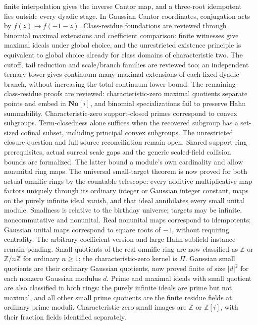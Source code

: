 \documentclass[11pt]{article}
\newcommand{\SC}{\mathbf{No}[i]}
\newcommand{\Z}{\mathbb{Z}}
\begin{document}
{finite interpolation gives the inverse Cantor map, and a three-root
idempotent lies outside every dyadic stage. In Gaussian Cantor coordinates,
conjugation acts by $f(z)\mapsto\overline{f(-1-z)}$.
Class-residue foundations are reviewed through binomial maximal extensions
and coefficient comparison: finite witnesses give maximal ideals under
global choice, and the unrestricted existence principle is equivalent
to global choice already for class domains of characteristic two.
The cutoff, tail reduction and scale/branch families are reviewed too;
an independent ternary tower gives continuum many maximal extensions
of each fixed dyadic branch, without increasing the total continuum
lower bound. The remaining class-residue proofs are reviewed:
characteristic-zero maximal quotients separate points and embed in $\SC$,
and binomial specializations fail to preserve Hahn summability.
Characteristic-zero support-closed primes correspond to convex
subgroups. Term-closedness alone suffices when the recovered
subgroup has a set-sized cofinal subset, including principal convex
subgroups. The unrestricted closure question and full source
reconciliation remain open. Shared support-ring prerequisites, actual
surreal scale gaps and the generic scaled-field collision bounds are
formalized. The latter bound a module's own cardinality and allow
nonunital ring maps. The universal small-target theorem is now proved for
both actual omnific rings by the countable telescope: every additive
multiplicative map factors uniquely through its ordinary integer or Gaussian
integer constant, maps on the purely infinite ideal vanish, and that ideal
annihilates every small unital module. Smallness is relative to the birthday
universe; targets may be infinite, noncommutative and nonunital. Real
nonunital maps correspond to idempotents; Gaussian unital maps correspond
to square roots of $-1$, without requiring centrality. The arbitrary-coefficient
version and large Hahn-subfield instance remain pending.
Small quotients of the real omnific ring are now classified as $\Z$ or
$\Z/n\Z$ for ordinary $n\ge1$; the characteristic-zero kernel is $\Pi$.
Gaussian small quotients are their ordinary Gaussian quotients, now proved
finite of size $|d|^2$ for each nonzero Gaussian modulus $d$.
Prime and maximal ideals with small quotient are also classified in both
rings: the purely infinite ideals are prime but not maximal, and all other
small prime quotients are the finite residue fields at ordinary prime moduli.
Characteristic-zero small images are $\Z$ or $\Z[i]$, with their fraction
fields identified separately.
}
\end{document}
